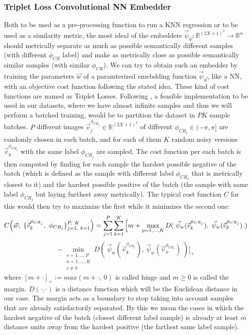 \documentclass[11pt, a4paper, twoside]{article} %
\newcommand{\R}{\mathbb{R}} %
\begin{document}
\subsubsection*{Triplet Loss Convolutional NN Embedder}
Both to be used as a pre-processing function to run a KNN regression or to be used as a similarity metric, the most ideal of the embedders $\vec{\psi}_{\vec{w}}:\R^{(2X+1)^2}\rightarrow \R^n$ should metrically separate as much as possible semantically different samples (with different $\phi_{CR}$ label) and make as metrically close as possible semantically similar samples (with similar $\phi_{CR}$). We can try to obtain such an embedder by training the parameters $\vec{w}$ of a paramterized emebdding function $\vec{\psi}_{\vec{w}}$, like a NN, with an objective cost function following the stated idea. These kind of cost functions are named as Triplet Losses. Following \cite{triplet}, a feasible implementation to be used in our datasets, where we have almost infinite samples and thus we will perform a batched training, would be to partition the dataset in $PK$ sample batches. $P$ different images $\vec{v}_j^{\phi_{CR_j}}\in\R^{(2X+1)^2}$ of different $\phi_{CR_j}\in(-\pi,\pi]$ are randomly chosen in each batch, and for each of them $K$ random noisy versions $\vec{v}_k^{\phi_{CR_j}}$ with the same label $\phi_{CR_j}$ are sampled. The cost function per each batch is then computed by finding for each sample the hardest possible negative of the batch (which is defined as the sample with different label $\phi_{CR_s}$ that is metrically closest to it) and the hardest possible positive of the batch (the sample with same label $\phi_{CR_j}$ but laying furthest away metrically). The typical cost function $C$ for this would then try to maximize the first while it minimizes the second one:
\begin{equation}
C\qty(\vec{w};\ \{\vec{v}_k^{\phi_{CR_j}},\ \phi_{CR_j}\}_{j=1,\ k=1}^{P,\ K})=\sum_{j=1}^P\sum_{k=1}^K\Big[ m+\max_{p=1,...,K}D(\ \vec{\psi}_w(\vec{v}_k^{\phi_{CR_j}}),\ \vec{\psi}_w(\vec{v}_p^{\phi_{CR_j}})\ )
\end{equation}
$$
 - \min_{\substack{s=1,...,P\\ n=1,...,K\\ s\neq k}}D(\ \vec{\psi}_w(\vec{v}_k^{\phi_{CR_j}}),\ \vec{\psi}_w(\vec{v}_n^{\phi_{CR_s}})\ )\Big]_+
$$
where $[m+\cdot]_+:=max(m+\cdot,\ 0)$ is called hinge and $m\geq 0$ is called the margin. $D(\cdot,\cdot)$ is a distance function which will be the Euclidean distance in our case. The margin acts as a boundary to stop taking into account samples that are already satisfactorily separated. By this we mean the cases in which the hardest negative of the batch (closest different label sample) is already at least $m$ distance units away from the hardest positive (the farthest same label sample).
\end{document}
